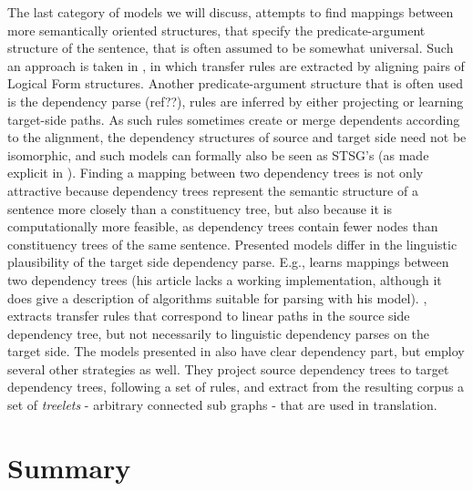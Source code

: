 \documentclass{report}
\theoremstyle{definition}
\theoremstyle{plain}
\begin{document}
The last category of models we will discuss, attempts to find mappings between more semantically oriented structures, that specify the predicate-argument structure of the sentence, that is often assumed to be somewhat universal. Such an approach is taken in \cite{menezes2003best}, in which transfer rules are extracted by aligning pairs of Logical Form structures. Another predicate-argument structure that is often used is the dependency parse (ref??), rules are inferred by either projecting or learning target-side paths. As such rules sometimes create or merge dependents according to the alignment, the dependency structures of source and target side need not be isomorphic, and such models can formally also be seen as STSG's (as made explicit in \cite{eisner2003learning}). Finding a mapping between two dependency trees is not only attractive because dependency trees represent the semantic structure of a sentence more closely than a constituency tree, but also because it is computationally more feasible, as dependency trees contain fewer nodes than constituency trees of the same sentence. Presented models differ in the linguistic plausibility of the target side dependency parse. E.g., \cite{eisner2003learning} learns mappings between two dependency trees (his article lacks a working implementation, although it does give a description of algorithms suitable for parsing with his model). \cite{lin2004path}, extracts transfer rules that correspond to linear paths in the source side dependency tree, but not necessarily to linguistic dependency parses on the target side. The models presented in \cite{quirk2005dependency,quirk2006dependency,quirk2006we} also have clear dependency part, but employ several other strategies as well. They project source dependency trees to target dependency trees, following a set of rules, and extract from the resulting corpus a set of \textit{treelets} - arbitrary connected sub graphs - that are used in translation.

\section{Summary}
\end{document}
